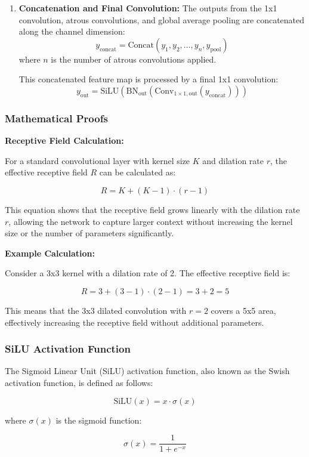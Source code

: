\documentclass[conference]{IEEEtran}
\begin{document}
\begin{enumerate}
    \item \textbf{Concatenation and Final Convolution:}
    The outputs from the 1x1 convolution, atrous convolutions, and global average pooling are concatenated along the channel dimension:
    \[
    y_{\text{concat}} = \text{Concat}(y_1, y_2, \ldots, y_n, y_{\text{pool}})
    \]
    where $ n $ is the number of atrous convolutions applied.

    This concatenated feature map is processed by a final 1x1 convolution:
    \[
    y_{\text{out}} = \text{SiLU}(\text{BN}_{\text{out}}(\text{Conv}_{1 \times 1, \text{out}}(y_{\text{concat}})))
    \]
\end{enumerate}

\subsubsection{Mathematical Proofs}
\textbf{Receptive Field Calculation:}

For a standard convolutional layer with kernel size \( K \) and dilation rate \( r \), the effective receptive field \( R \) can be calculated as:

\[
R = K + (K - 1) \cdot (r - 1)
\]

This equation shows that the receptive field grows linearly with the dilation rate \( r \), allowing the network to capture larger context without increasing the kernel size or the number of parameters significantly.

\textbf{Example Calculation:}

Consider a 3x3 kernel with a dilation rate of 2. The effective receptive field is:

\[
R = 3 + (3 - 1) \cdot (2 - 1) = 3 + 2 = 5
\]

This means that the 3x3 dilated convolution with \( r = 2 \) covers a 5x5 area, effectively increasing the receptive field without additional parameters.

\subsubsection{SiLU Activation Function}
The Sigmoid Linear Unit (SiLU) activation function, also known as the Swish activation function, is defined as follows:

\[
\text{SiLU}(x) = x \cdot \sigma(x)
\]

where \( \sigma(x) \) is the sigmoid function:

\[
\sigma(x) = \frac{1}{1 + e^{-x}}
\]
\end{document}
